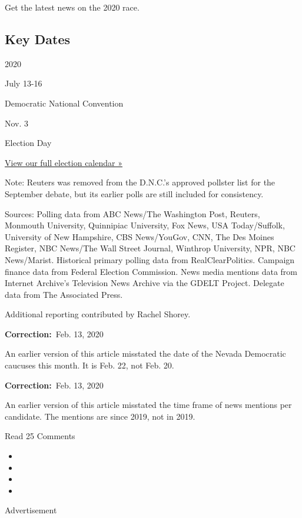 Get the latest news on the 2020 race.

\hypertarget{key-dates}{%
\subsection{Key Dates}\label{key-dates}}

2020

July 13-16

Democratic National Convention

Nov. 3

Election Day

\href{https://www.nytimes3xbfgragh.onion/interactive/2019/us/elections/2020-presidential-election-calendar.html}{View
our full election calendar »}

Note: Reuters was removed from the D.N.C.'s approved pollster list for
the September debate, but its earlier polls are still included for
consistency.

Sources: Polling data from ABC News/The Washington Post, Reuters,
Monmouth University, Quinnipiac University, Fox News, USA Today/Suffolk,
University of New Hampshire, CBS News/YouGov, CNN, The Des Moines
Register, NBC News/The Wall Street Journal, Winthrop University, NPR,
NBC News/Marist. Historical primary polling data from RealClearPolitics.
Campaign finance data from Federal Election Commission. News media
mentions data from Internet Archive's Television News Archive via the
GDELT Project. Delegate data from The Associated Press.

Additional reporting contributed by Rachel Shorey.

\textbf{Correction:}~Feb. 13, 2020

An earlier version of this article misstated the date of the Nevada
Democratic caucuses this month. It is Feb. 22, not Feb. 20.

\textbf{Correction:}~Feb. 13, 2020

An earlier version of this article misstated the time frame of news
mentions per candidate. The mentions are since 2019, not in 2019.

Read 25 Comments

\begin{itemize}
\item
\item
\item
\item
\end{itemize}

Advertisement

